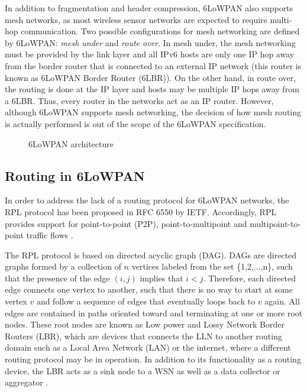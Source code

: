 \documentclass[final,authoryear,3p,twocolumn]{elsarticle}
\begin{document}
In addition to fragmentation and header compression, 6LoWPAN also supports mesh networks, as most wireless sensor networks are expected to require multi-hop communication. Two possible configurations for mesh networking are defined by 6LoWPAN: \textit{mesh under} and \textit{route over}. In mesh under, the mesh networking must be provided by the link layer and all IPv6 hosts are only one IP hop away from the border router that is connected to an external IP network (this router is known as 6LoWPAN Border Router (6LBR)). On the other hand, in route over, the routing is done at the IP layer and hosts may be multiple IP hops away from a 6LBR. Thus, every router in the networks act as an IP router. However, although 6LoWPAN supports mesh networking, the decision of how mesh routing is actually performed is out of the scope of the 6LoWPAN specification.

\begin{figure}
\centering
{}
\caption{6LoWPAN architecture}
\label{stack_6lowpan}
\end{figure}

\subsection{Routing in 6LoWPAN}
In order to address the lack of a routing protocol for 6LoWPAN networks, the RPL protocol has been proposed in RFC 6550 by IETF. Accordingly, RPL provides support for point-to-point (P2P), point-to-multipoint and multipoint-to-point traffic flows \citep{RFC6550}.

The RPL protocol is based on directed acyclic graph (DAG). DAGs are directed graphs formed by a collection of $n$ vertices labeled from the set \{1,2,...,n\}, such that the presence of the edge $(i,j)$ implies that $i < j$. Therefore, each directed edge connects one vertex to another, such that there is no way to start at some vertex $v$ and follow a sequence of edges that eventually loops back to $v$ again. All edges are contained in paths oriented toward and terminating at one or more root nodes. These root nodes are known as Low power and Lossy Network Border Routers (LBR), which are devices that connects the LLN to another routing domain such as a Local Area Network (LAN) or the internet, where a different routing protocol may be in operation. In addition to its functionality as a routing device, the LBR acts as a sink node to a WSN as well as a data collector or aggregator \citep{RFC7102}.
\end{document}
